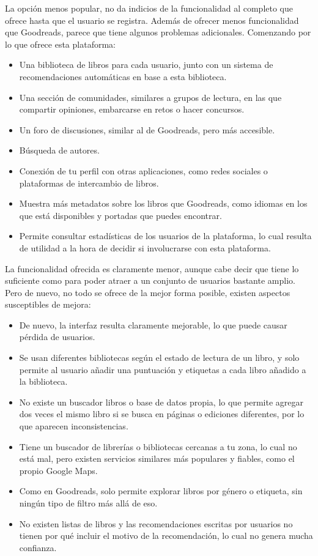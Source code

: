 La opción menos popular, no da indicios de la funcionalidad al completo que ofrece hasta que el usuario se registra. Además de ofrecer menos funcionalidad que Goodreads\cite{Goodreads}, parece que tiene algunos problemas adicionales. Comenzando por lo que ofrece esta plataforma:

\begin{itemize}
\item Una biblioteca de libros para cada usuario, junto con un sistema de recomendaciones automáticas en base a esta biblioteca.
\item Una sección de comunidades, similares a grupos de lectura, en las que compartir opiniones, embarcarse en retos o hacer concursos.
\item Un foro de discusiones, similar al de Goodreads, pero más accesible.
\item Búsqueda de autores.
\item Conexión de tu perfil con otras aplicaciones, como redes sociales o plataformas de intercambio de libros.
\item Muestra más metadatos sobre los libros que Goodreads\cite{Goodreads}, como idiomas en los que está disponibles y portadas que puedes encontrar.
\item Permite consultar estadísticas de los usuarios de la plataforma, lo cual resulta de utilidad a la hora de decidir si involucrarse con esta plataforma.
\end{itemize}

La funcionalidad ofrecida es claramente menor, aunque cabe decir que tiene lo suficiente como para poder atraer a un conjunto de usuarios bastante amplio. Pero de nuevo, no todo se ofrece de la mejor forma posible, existen aspectos susceptibles de mejora:

\begin{itemize}
\item De nuevo, la interfaz resulta claramente mejorable, lo que puede causar pérdida de usuarios.
\item Se usan diferentes bibliotecas según el estado de lectura de un libro, y solo permite al usuario añadir una puntuación y etiquetas a cada libro añadido a la biblioteca.
\item No existe un buscador libros o base de datos propia, lo que permite agregar dos veces el mismo libro si se busca en páginas o ediciones diferentes, por lo que aparecen inconsistencias.
\item Tiene un buscador de librerías o bibliotecas cercanas a tu zona, lo cual no está mal, pero existen servicios similares más populares y fiables, como el propio Google Maps.
\item Como en Goodreads\cite{Goodreads}, solo permite explorar libros por género o etiqueta, sin ningún tipo de filtro más allá de eso.
\item No existen listas de libros y las recomendaciones escritas por usuarios no tienen por qué incluir el motivo de la recomendación, lo cual no genera mucha confianza.
\end{itemize}

